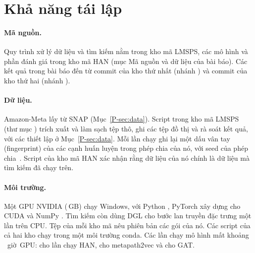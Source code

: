 


\section{Khả năng tái lập}
\label{app:repro}

\paragraph{Mã nguồn.} Quy trình xử lý dữ liệu và tìm kiếm nằm trong kho mã LMSPS, các mô hình và
phần đánh giá trong kho mã HAN (mục Mã nguồn và dữ liệu của bài báo). Các kết quả trong bài báo đến
từ commit
\texttt{} của kho thứ nhất (nhánh \texttt{}) và
commit \texttt{} của kho thứ hai (nhánh \texttt{}).

\paragraph{Dữ liệu.} Amazon-Meta lấy từ SNAP (Mục~\ref*{P-sec:data}). Script 
trong kho mã LMSPS (thư mục ) trích xuất và làm sạch tệp thô, ghi các tệp đồ thị và rà
soát kết quả, với các thiết lập ở Mục~\ref*{P-sec:data}. Mỗi lần chạy ghi lại một dấu vân tay
(fingerprint) của các cạnh huấn luyện trong phép chia của nó, \texttt{} với
seed của phép chia~. Script  của kho mã HAN xác nhận rằng dữ
liệu của nó chính là dữ liệu mà tìm kiếm đã chạy trên.

\paragraph{Môi trường.} Một GPU NVIDIA  (\,GB) chạy Windows, với
Python , PyTorch  xây dựng cho CUDA  và NumPy
. Tìm kiếm còn dùng DGL  cho bước lan truyền đặc trưng một lần trên
CPU. Tệp  của mỗi kho mã nêu phiên bản các gói của nó. Các script của cả
hai kho chạy trong một môi trường conda. Các lần chạy mô hình mất khoảng ~giờ~GPU:
 cho  lần chạy HAN,  cho metapath2vec và
 cho GAT.

